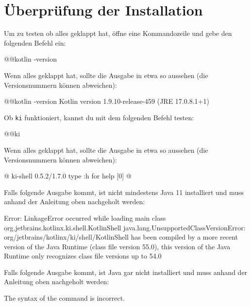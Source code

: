 \section*{Überprüfung der Installation}\label{sec:check}
Um zu testen ob alles geklappt hat, öffne eine Kommandozeile und gebe den folgenden Befehl ein:
\begin{commandshell}
    @\shellprefix{}@kotlin -version
\end{commandshell}

Wenn alles geklappt hat, sollte die Ausgabe in etwa so aussehen (die Versionsnummern können abweichen):
\begin{commandshell}[][]
    @\shellprefix{}@kotlin -version
    Kotlin version 1.9.10-release-459 (JRE 17.0.8.1+1)
\end{commandshell}

Ob \texttt{ki} funktioniert, kannst du mit dem folgenden Befehl testen:
\begin{commandshell}
    @\shellprefix{}@ki
\end{commandshell}
Wenn alles geklappt hat, sollte die Ausgabe in etwa so aussehen (die Versionsnummern können abweichen):
\begin{commandshell}[][minted language=text]
    @\shellprefix@ki
    ki-shell 0.5.2/1.7.0
    type :h for help
    [0] @\shellcursor@
\end{commandshell}
Falls folgende Ausgabe kommt, ist nicht mindestens Java 11 installiert und muss anhand der Anleitung oben nachgeholt werden:
\nopagebreak
\begin{commandshell}[][minted language=text]
Error: LinkageError occurred while loading main class org.jetbrains.kotlinx.ki.shell.KotlinShell
        java.lang.UnsupportedClassVersionError: org/jetbrains/kotlinx/ki/shell/KotlinShell has been compiled by a more recent version of the Java Runtime (class file version 55.0), this version of the Java Runtime only recognizes class file versions up to 54.0
\end{commandshell}
Falls folgende Ausgabe kommt, ist Java gar nicht installiert und muss anhand der Anleitung oben nachgeholt werden:
\nopagebreak
\begin{commandshell}[][minted language=text]
The syntax of the command is incorrect.
\end{commandshell}



